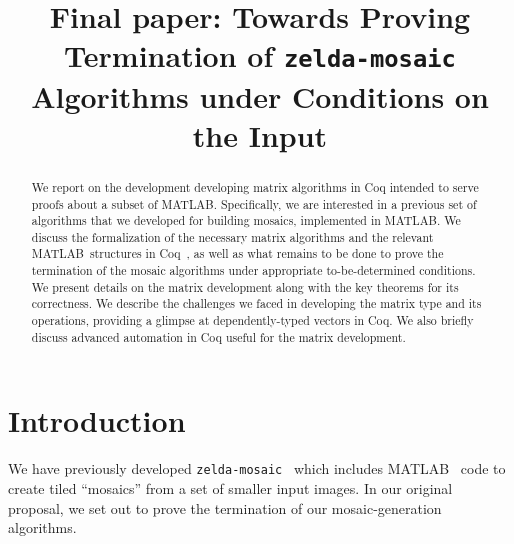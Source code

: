 \documentclass[11pt,conference]{IEEEtran}
\newcommand{\matlab}{MATLAB}
\theoremstyle{plain} %
\theoremstyle{definition}
\theoremstyle{remark}
\begin{document}
\title{Final paper: Towards Proving Termination of \texttt{zelda-mosaic} Algorithms under Conditions on the Input}

\author{
\and
{}
}

\maketitle

\begin{abstract}
    We report on the development developing matrix algorithms in Coq intended to
    serve proofs about a subset of \matlab\@. Specifically, we are interested in
    a previous set of algorithms that we developed for building mosaics,
    implemented in \matlab\@. We discuss the formalization of the necessary
    matrix algorithms and the relevant \matlab\ structures in Coq~\cite{Coq}, as
    well as what remains to be done to prove the termination of the mosaic
    algorithms under appropriate to-be-determined conditions. We present details
    on the matrix development along with the key theorems for its correctness.
    We describe the challenges we faced in developing the matrix type and its
    operations, providing a glimpse at dependently-typed vectors in Coq. We also
    briefly discuss advanced automation in Coq useful for the matrix
    development.
\end{abstract}


\section{Introduction}

We have previously developed \texttt{zelda-mosaic}~\cite{zelda_mosaic} which
includes \matlab~\cite{matlab} code to create tiled ``mosaics'' from a set of
smaller input images. In our original proposal, we set out to prove the
termination of our mosaic-generation algorithms.
\end{document}
